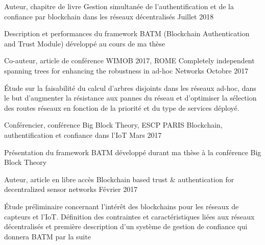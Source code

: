 

\begin{cventries}

  \cventry
    {Auteur, chapitre de livre} %
    {Gestion simultanée de l’authentification et de la confiance par blockchain dans les réseaux décentralisés} %
    {} %
    {Juillet 2018} %
    {
      \begin{cvitems} %
        \item {Description et performances du framework BATM (Blockchain Authentication and Trust Module) développé au cours de ma thèse}
      \end{cvitems}
    }

  \cventry
    {Co-auteur, article de conférence WIMOB 2017, ROME} %
    {Completely independent spanning trees for enhancing the robustness in ad-hoc Networks} %
    {} %
    {Octobre 2017} %
    {
      \begin{cvitems} %
        \item {\'Etude sur la faisabilité du calcul d'arbres disjoints dans les réseaux ad-hoc, dans le but d'augmenter la résistance aux pannes du réseau et d'optimiser la sélection des routes réseaux en fonction de la priorité et du type de services déployé.}
      \end{cvitems}
    }

  \cventry
    {Conférencier, conférence Big Block Theory, ESCP PARIS} %
    {Blockchain, authentification et confiance dans l'IoT}
    {} %
    {Mars 2017} %
    {
      \begin{cvitems} %
      \item {Présentation du framework BATM développé durant ma thèse à la conférence Big Block Theory}
      \end{cvitems}
    }

  \cventry
    {Auteur, article en libre accès} %
    {Blockchain based trust \& authentication for decentralized sensor networks} %
    {} %
    {Février 2017} %
    {
      \begin{cvitems} %
        \item {\'Etude préliminaire concernant l'intérêt des blockchains pour les réseaux de capteurs et l'IoT. Définition des contraintes et caractéristiques liées aux réseaux décentralisés et première description d'un système de gestion de confiance qui donnera BATM par la suite}
      \end{cvitems}
    }


\end{cventries}
